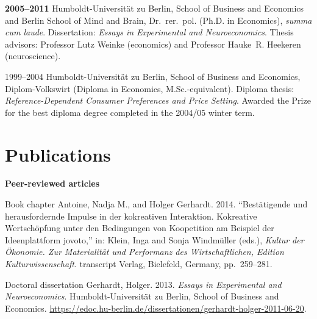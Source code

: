 \documentclass[11pt, a4paper, titleabove]{simplecv}
\newcommand{\caps}[1]{\textscale{0.96}{\addfontfeature{LetterSpace=5}\MakeUppercase{#1}}}
\newcommand{\caps}[1]{\textscale{0.96}{\textls[35]{\MakeUppercase{#1}}}}
\begin{document}
\begin{topic}

	\item[\textbf{2005--2011}]
	{Humboldt-Universität zu Berlin,} School of Business and Economics and Berlin School of Mind and Brain, Dr.~rer.~pol. (Ph.D. in Economics), \textit{summa cum laude}. Dissertation: \textit{Essays in Experimental and Neuroeconomics}. Thesis advisors: Professor Lutz Weinke (economics) and Professor Hauke~R. Heekeren (neuroscience).

	\item[1999--2004]
	{Humboldt-Universität zu Berlin,} School of Business and Economics, {Diplom-Volkswirt} (Diploma in Economics, M.Sc.-equivalent). Diploma thesis: \textit{Reference-Dependent Consumer Preferences and Price Setting}. Awarded the \caps{WWG} Prize for the best diploma degree completed in the 2004/05 winter term.

\end{topic}


\section{Publications}

\begin{topic}

	\begin{refcontext}[sorting=none]
	\nocite{Gerhardt2017}
	\nocite{Marsh2017}
	\nocite{Behrens2017}
	\nocite{Strang2017}
	\nocite{Schulreich2016}
	\nocite{Marsh2015}
	\nocite{Schulreich2014}

	\item[\textbf{Peer-reviewed articles}]
	\printbibliography[heading=none]
	\end{refcontext}
	
	\item[Book chapter]
	Antoine, Nadja M., and Holger Gerhardt. 2014. {``Bestätigende und herausfordernde Impulse in der kokreativen Interaktion. Kokreative Wertschöpfung unter den Bedingungen von Koopetition am Beispiel der Ideenplattform jovoto,'' in: Klein, Inga and Sonja Windmüller (eds.), \textit{Kultur der Ökonomie. Zur Materialität und Performanz des Wirtschaft\-lichen, Edition Kulturwissenschaft}. transcript Verlag, Bielefeld,} Germany, \mbox{pp. 259--281}.
	\item[Doctoral dissertation]
	Gerhardt, Holger. 2013. \textit{Essays in Experimental and Neuro\-economics}. {Humboldt-Universität zu Berlin,} School of Business and Economics. \url{https://edoc.hu-berlin.de/dissertationen/gerhardt-holger-2011-06-20}.

\end{topic}
\end{document}
